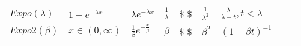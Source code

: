 \documentclass[]{tufte-book}
\begin{document}
\begin{longtable}[]{@{}lllllllll@{}}
\begin{minipage}[t]{0.08\columnwidth}
\(Expo(\lambda)\)\strut
\end{minipage} & \begin{minipage}[t]{0.08\columnwidth}\raggedright
\(1-e^{-\lambda x}\)\strut
\end{minipage} & \begin{minipage}[t]{0.08\columnwidth}\raggedright
\(\lambda e^{-\lambda x}\)\strut
\end{minipage} & \begin{minipage}[t]{0.08\columnwidth}\raggedright
\(\frac{1}{\lambda}\)\strut
\end{minipage} & \begin{minipage}[t]{0.08\columnwidth}\raggedright
\$ \$\strut
\end{minipage} & \begin{minipage}[t]{0.08\columnwidth}\raggedright
\(\frac{1}{\lambda^2}\)\strut
\end{minipage} & \begin{minipage}[t]{0.08\columnwidth}\raggedright
\(\frac{\lambda}{\lambda - t}, t < \lambda\)\strut
\end{minipage} & \begin{minipage}[t]{0.08\columnwidth}\raggedright
\strut
\end{minipage} & \begin{minipage}[t]{0.08\columnwidth}\raggedright
\strut
\end{minipage}\tabularnewline
\begin{minipage}[t]{0.08\columnwidth}\raggedright
\(Expo2(\beta)\)\strut
\end{minipage} & \begin{minipage}[t]{0.08\columnwidth}\raggedright
\(x \in (0,\infty)\)\strut
\end{minipage} & \begin{minipage}[t]{0.08\columnwidth}\raggedright
\(\frac1{\beta} e^{-\frac{x}\beta}\)\strut
\end{minipage} & \begin{minipage}[t]{0.08\columnwidth}\raggedright
\(\beta\)\strut
\end{minipage} & \begin{minipage}[t]{0.08\columnwidth}\raggedright
\$ \$\strut
\end{minipage} & \begin{minipage}[t]{0.08\columnwidth}\raggedright
\(\beta^2\)\strut
\end{minipage} & \begin{minipage}[t]{0.08\columnwidth}\raggedright
\((1-\beta t)^{-1}\)\strut

\end{minipage}
\end{longtable}
\end{document}

